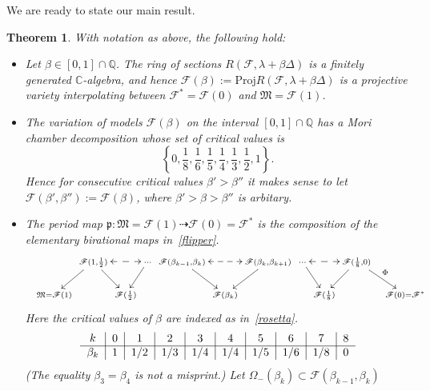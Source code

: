 \documentclass[11pt]{amsart}
\numberwithin{equation}{section}
\theoremstyle{plain}
\newtheorem{theorem}{Theorem}[section]
\theoremstyle{remark}
\theoremstyle{definition}
\newcommand{\bQ}{\mathbb{Q}}
\newcommand{\sF}{\mathscr{F}}
\newcommand{\gp}{\mathfrak{p}}
\newcommand{\Proj}{\mathrm{Proj}}
\newcommand{\CC}{{\mathbb C}}
\newcommand{\dra}{\dashrightarrow}
\newcommand{\gM}{\mathfrak{M}}
\newcommand{\QQ}{{\mathbb Q}}
\begin{document}
We are ready to state our main result.
%
 \begin{theorem} \label{thm:mainthm1}
With notation as above, the following hold:
% 
 \begin{itemize}
%
 \item[i)]   
 Let  $\beta\in[0,1]\cap\bQ$. The ring of sections $R(\sF, \lambda+\beta\Delta)$ is a finitely generated $\CC$-algebra, and hence $\sF(\beta):=\Proj R(\sF, \lambda+\beta\Delta)$ is a projective variety interpolating between $\sF^{*}=\sF(0)$ and $\gM=\sF(1)$. 
  \item[ii)] 
  The variation of models $\sF(\beta)$ on the interval $[0,1]\cap\QQ$ has a Mori chamber decomposition whose set of critical values is
%
  $$\left\{0,\frac{1}{8},\frac{1}{6}, \frac{1}{5}, \frac{1}{4},\frac{1}{3}, \frac{1}{2},1\right\}.$$
Hence for consecutive critical values $\beta'>\beta''$ it makes sense to let $\sF(\beta',\beta''):=\sF(\beta)$, where $\beta'>\beta>\beta''$ is arbitary.
%
  \item[iii)] 
 The  period map $\gp\colon \gM=\sF(1)  \dra \sF(0)=\sF^*$ is the composition of the elementary birational maps in~\eqref{flipper}. 
\begin{equation}\label{flipper}
%
\xymatrix @R=.07in @C=.01in{
\scriptstyle  & & \scriptstyle \sF ( 1 , \frac{1}{2} ) \ar@{<-->}[rr]\ar[ldd] \ar[rdd] & & \scriptstyle \cdots \ar[ldd] & \scriptstyle  \sF (\beta_{k-1}, \beta_k) \ar[rdd]\ar@{<-->}[rr] & &  
\scriptstyle  \sF ( \beta_k , \beta_{k+1}) \ar[ldd] &\scriptstyle \cdots \ar[rdd]   & & \scriptstyle \sF (\frac{1}{8},0)\ar@{<-->}[ll]\ar[ldd] \ar[rrdd]^{\scriptstyle \Phi}  \\
&&&&&&\\
& \scriptstyle \gM=\sF(1) & & \scriptstyle \sF( \frac{1}{2} ) & & & \scriptstyle \sF( \beta_k )  & & &  \scriptstyle \sF(\frac{1}{8})  & & & \scriptstyle \sF(0)=\sF^{*}  \\
 }
 \end{equation}
%
Here the critical values of $\beta$ are indexed as in~\eqref{rosetta}.
%
\begin{equation}\label{rosetta}
%
\begin{tabular}{c|c|c|c|c|c|c|c | c | c}
%
$k$  & $0$ & $1$  & $2$  & $3$  &  $4$  &  $5$  & $6$ & $7$ & $8$ \\
%
\hline
%
$\beta_k$ &  $1$ & $1/2$ &  $1/3$  & $1/4$ &  $1/4$ &   $1/5$ &   $1/6$ &  $1/8$ & $0$ 
%
\end{tabular}
%
\end{equation}
%
(The equality $\beta_3=\beta_4$ is not a misprint.) Let $\Omega_{-}(\beta_k)\subset \sF(\beta_{k-1},\beta_k)$ 

\end{itemize}
\end{theorem}
\end{document}

